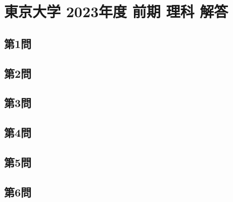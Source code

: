 ﻿\documentclass[../../uem_mat_tok_a.tex]{subfiles}
\begin{document}
    \section{東京大学 2023年度 前期 理科 解答}

    \subsection{第1問}
    

    \clearpage
    \subsection{第2問}
    

    \clearpage
    \subsection{第3問}
    

    \clearpage
    \subsection{第4問}
    

    \clearpage
    \subsection{第5問}
    

    \clearpage
    \subsection{第6問}
    

    \clearpage
\end{document}
